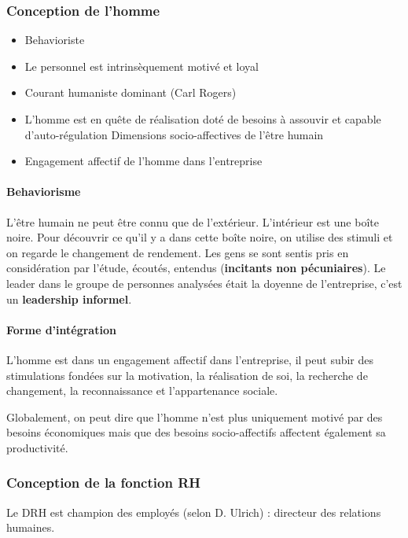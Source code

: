\documentclass[12pt]{article}
\begin{document}
	  \subsubsection{Conception de l'homme}
	  
	  \begin{itemize}
	   \item Behavioriste
	   \item Le personnel est intrinsèquement motivé et loyal
	   \item Courant humaniste dominant (Carl Rogers)
	   \item L'homme est en quête de réalisation
	    \subitem doté de besoins à assouvir et capable d'auto-régulation
	    \subitem Dimensions socio-affectives de l'être humain
	   \item Engagement affectif de l'homme dans l'entreprise
	  \end{itemize}

	  
	  \paragraph{Behaviorisme} L'être humain ne peut être connu que de l'extérieur. L'intérieur est une \og{} boîte noire\fg{}. Pour découvrir ce qu'il y a dans cette boîte noire, on utilise des stimuli et on regarde le changement de rendement. Les gens se sont sentis pris en considération par l'étude, écoutés, entendus (\textbf{incitants non pécuniaires}). Le leader dans le groupe de personnes analysées était la doyenne de l'entreprise, c'est un \textbf{leadership informel}.
	  
	  \paragraph{Forme d'intégration} L'homme est dans un engagement affectif dans l'entreprise, il peut subir des stimulations fondées sur la motivation, la réalisation de soi, la recherche de changement, la reconnaissance et l'appartenance sociale.
	  
	  Globalement, on peut dire que l'homme n'est plus uniquement motivé par des besoins économiques mais que des besoins socio-affectifs affectent également sa productivité.
	  
	  
	  \subsubsection{Conception de la fonction RH}
	  
	  Le DRH est \og{} champion des employés\fg{} (selon D. Ulrich) : directeur des relations humaines.
	  
\end{document}

